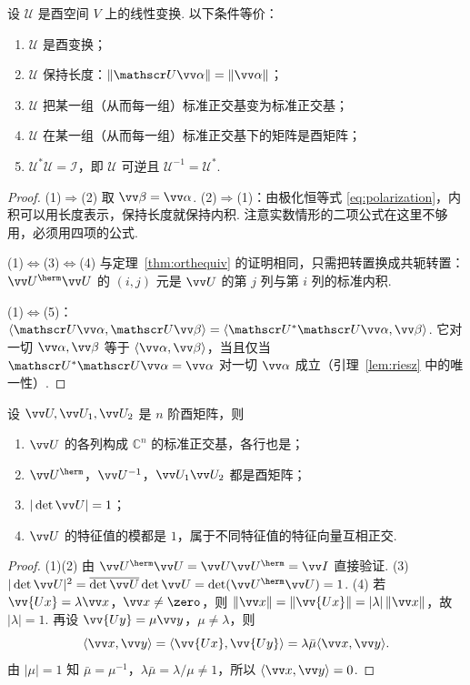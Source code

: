 	\begin{theorem}\label{thm:unitaryeq}
		设 $\mathscr U$ 是酉空间 $V$ 上的线性变换. 以下条件等价：
		\begin{enumerate}
			\item $\mathscr U$ 是酉变换；
			\item $\mathscr U$ 保持长度：$\|\mathscr U\vv\alpha\|=\|\vv\alpha\|$；
			\item $\mathscr U$ 把某一组（从而每一组）标准正交基变为标准正交基；
			\item $\mathscr U$ 在某一组（从而每一组）标准正交基下的矩阵是酉矩阵；
			\item $\mathscr U^*\mathscr U=\mathscr I$，即 $\mathscr U$ 可逆且 $\mathscr U^{-1}=\mathscr U^*$.
		\end{enumerate}
	\end{theorem}
	\begin{proof}
		(1)$\Rightarrow$(2) 取 $\vv\beta=\vv\alpha$. (2)$\Rightarrow$(1)：由极化恒等式 \eqref{eq:polarization}，内积可以用长度表示，保持长度就保持内积. 注意实数情形的二项公式在这里不够用，必须用四项的公式.
		
		(1)$\Leftrightarrow$(3)$\Leftrightarrow$(4) 与定理~\ref{thm:orthequiv} 的证明相同，只需把转置换成共轭转置：$\vv U^\herm\vv U$ 的 $(i,j)$ 元是 $\vv U$ 的第 $j$ 列与第 $i$ 列的标准内积.
		
		(1)$\Leftrightarrow$(5)：$\langle\mathscr U\vv\alpha,\mathscr U\vv\beta\rangle=\langle\mathscr U^*\mathscr U\vv\alpha,\vv\beta\rangle$. 它对一切 $\vv\alpha,\vv\beta$ 等于 $\langle\vv\alpha,\vv\beta\rangle$，当且仅当 $\mathscr U^*\mathscr U\vv\alpha=\vv\alpha$ 对一切 $\vv\alpha$ 成立（引理~\ref{lem:riesz} 中的唯一性）.
	\end{proof}
	
	\begin{proposition}\label{prop:unitaryprop}
		设 $\vv U,\vv U_1,\vv U_2$ 是 $n$ 阶酉矩阵，则
		\begin{enumerate}
			\item $\vv U$ 的各列构成 $\mathbb{C}^n$ 的标准正交基，各行也是；
			\item $\vv U^\herm$，$\vv U^{-1}$，$\vv U_1\vv U_2$ 都是酉矩阵；
			\item $|\det\vv U|=1$；
			\item $\vv U$ 的特征值的模都是 $1$，属于不同特征值的特征向量互相正交.
		\end{enumerate}
	\end{proposition}
	\begin{proof}
		(1)(2) 由 $\vv U^\herm\vv U=\vv U\vv U^\herm=\vv I$ 直接验证. (3) $|\det\vv U|^2=\overline{\det\vv U}\det\vv U=\det(\vv U^\herm\vv U)=1$. (4) 若 $\vv{Ux}=\lambda\vv x$，$\vv x\ne\zero$，则 $\|\vv x\|=\|\vv{Ux}\|=|\lambda|\,\|\vv x\|$，故 $|\lambda|=1$. 再设 $\vv{Uy}=\mu\vv y$，$\mu\ne\lambda$，则
		\[\langle\vv x,\vv y\rangle=\langle\vv{Ux},\vv{Uy}\rangle=\lambda\bar\mu\langle\vv x,\vv y\rangle.\]
		由 $|\mu|=1$ 知 $\bar\mu=\mu^{-1}$，$\lambda\bar\mu=\lambda/\mu\ne1$，所以 $\langle\vv x,\vv y\rangle=0$.
	\end{proof}
	
